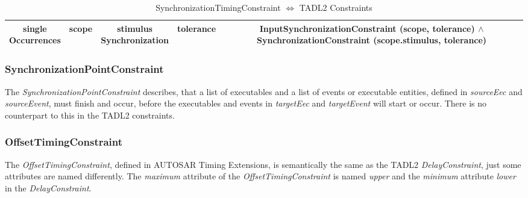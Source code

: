 \begin{table}
\begin{tabular}{|c|c|c|c|c|}
				\hline
				\makecell{single\\Occurrences}  & scope & \makecell{stimulus\\Synchronization} & tolerance & \makecell{InputSynchronizationConstraint\\\hspace{.5cm}(scope, tolerance)\\ $\land$ SynchronizationConstraint\\\hspace{.5cm}(scope.stimulus, tolerance)}\\
				\hline
			\end{tabular}
			\caption{SynchronizationTimingConstraint $\Leftrightarrow$ TADL2 Constraints}
			\label{ComparisonSynchronizationConstraints}
		\end{table}
	
	\subsubsection{SynchronizationPointConstraint}
		The \emph{SynchronizationPointConstraint} describes, that a list of executables and a list of events or executable entities, defined in \emph{sourceEec} and \emph{sourceEvent},  must finish and occur, before the executables and events in \emph{targetEec} and \emph{targetEvent} will start or occur. There is no counterpart to this in the TADL2 constraints.
		
	\subsubsection{OffsetTimingConstraint}
		The \emph{OffsetTimingConstraint}, defined in AUTOSAR Timing Extensions, is semantically the same as the TADL2 \emph{DelayConstraint}, just some attributes are named differently. The \emph{maximum} attribute of the \emph{OffsetTimingConstraint} is named \emph{upper} and the \emph{minimum} attribute \emph{lower} in the \emph{DelayConstraint}.
		
